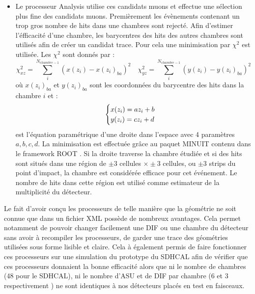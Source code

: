 \begin{itemize}[label=$\bullet$]
	\item Le processeur Analysis utilise ces candidats muons et effectue une sélection plus fine des candidats muons. Premièrement les évènements contenant un trop gros nombre de hits dans une chambres sont rejecté. Afin d'estimer l'éfficacité d'une chambre, les barycentres des hits des autres chambres sont utilisés afin de créer un candidat trace. Pour cela une minimisation par $\chi^2$ est utilisée. Les $\chi^2$ sont donnés par :
	\begin{equation}
	\chi_{xz}^2=\sum_i^{N_{chambre-1}}\left(x(z_{i})-x(z_{i})_{ba}\right)^2 \quad \chi_{yz}^2=\sum_i^{N_{chambre-1}}\left(y(z_{i})-y(z_{i})_{ba}\right)^2
	\end{equation}
	où $x(z_{i})_{ba}$ et $y(z_{i})_{ba}$ sont les coordonnées du barycentre des hits dans la chambre $i$ et :
\begin{equation}
\begin{cases}
\strut x(z_i)=az_i+b\\
y(z_i)=cz_i+d
\end{cases}
\end{equation}
est l'équation paramétrique d'une droite dans l'espace avec \num{4} paramètres $a,b,c,d$. La minimisation est effectuée grâce au paquet MINUIT \cite{James:2004xla} contenu dans le framework ROOT \cite{BRUN199781}.
Si la droite traverse la chambre étudiée et si des hits sont situés dans une région de $\pm 3$ cellules $\times\pm 3$ cellules, ou $\pm 3$ strips du point d'impact, la chambre est considérée efficace pour cet événement. Le nombre de hits dans cette région est utilisé comme estimateur de la multiplicité du détecteur.
\end{itemize}

Le fait d'avoir conçu les processeurs de telle manière que la géométrie ne soit connue que dans un fichier XML possède de nombreux avantages. Cela permet notamment de pouvoir changer facilement une DIF ou une chambre du détecteur sans avoir à recompiler les processeurs, de garder une trace des géométries utilisées sous forme lisible et claire. Cela à également permis de faire fonctionner ces processeurs sur une simulation du prototype du SDHCAL afin de vérifier que ces processeurs donnaient la bonne efficacité alors que ni le nombre de chambres (48 pour le SDHCAL), ni le nombre d'ASU et de DIF par chambre (6 et 3 respectivement ) ne sont identiques à nos détecteurs placés en test en faisceaux.

